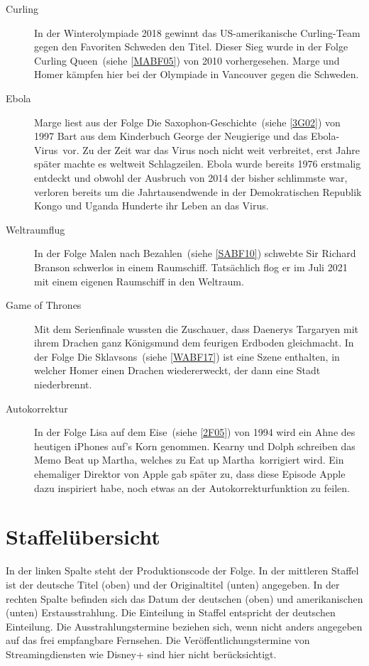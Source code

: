 \begin{appendix}
\begin{description}
  \item[Curling] In der Winterolympiade 2018 gewinnt das US-amerikanische Curling-Team gegen den Favoriten Schweden den Titel. Dieser Sieg wurde in der Folge \glqq Curling Queen\grqq\ (siehe \ref{MABF05}) von 2010 vorhergesehen. Marge und Homer kämpfen hier bei der Olympiade in Vancouver gegen die Schweden.
  \item[Ebola] Marge liest aus der Folge \glqq Die Saxophon-Geschichte\grqq\ (siehe \ref{3G02}) von 1997 Bart aus dem Kinderbuch \glqq George der Neugierige und das Ebola-Virus\grqq\ vor. Zu der Zeit war das Virus noch nicht weit verbreitet, erst Jahre später machte es weltweit Schlagzeilen. Ebola wurde bereits 1976 erstmalig entdeckt und obwohl der Ausbruch von 2014 der bisher schlimmste war, verloren bereits um die Jahrtausendwende in der Demokratischen Republik Kongo und Uganda Hunderte ihr Leben an das Virus.
  \item[Weltraumflug] In der Folge \glqq Malen nach Bezahlen\grqq\ (siehe \ref{SABF10}) schwebte Sir Richard Branson schwerlos in einem Raumschiff. Tatsächlich flog er im Juli 2021 mit einem eigenen Raumschiff in den Weltraum.
  \item[Game of Thrones] Mit dem Serienfinale wussten die Zuschauer, dass Daenerys Targaryen mit ihrem Drachen ganz Königsmund dem feurigen Erdboden gleichmacht. In der Folge \glqq Die Sklavsons\grqq\ (siehe \ref{WABF17}) ist eine Szene enthalten, in welcher Homer einen Drachen wiedererweckt, der dann eine Stadt niederbrennt.
  \item[Autokorrektur] In der Folge \glqq Lisa auf dem Eise\grqq\ (siehe \ref{2F05}) von 1994 wird ein Ahne des heutigen iPhones auf's Korn genommen. Kearny und Dolph schreiben das Memo \glqq Beat up Martha\grqq, welches zu \glqq Eat up Martha\grqq\ korrigiert wird. Ein ehemaliger Direktor von Apple gab später zu, dass diese Episode Apple dazu inspiriert habe, noch etwas an der Autokorrekturfunktion zu feilen.
\end{description}

\section{Staffelübersicht}\label{StaffelUebersicht}
In der linken Spalte steht der Produktionscode der Folge. In der mittleren Staffel ist der deutsche Titel (oben) und der Originaltitel (unten) angegeben. In der rechten Spalte befinden sich das Datum der deutschen (oben) und amerikanischen (unten) Erstausstrahlung. Die Einteilung in Staffel entspricht der deutschen Einteilung. Die Ausstrahlungstermine beziehen sich, wenn nicht anders angegeben auf das frei empfangbare Fernsehen. Die Veröffentlichungstermine von Streamingdiensten wie Disney+ sind hier nicht berücksichtigt.


\end{appendix}
